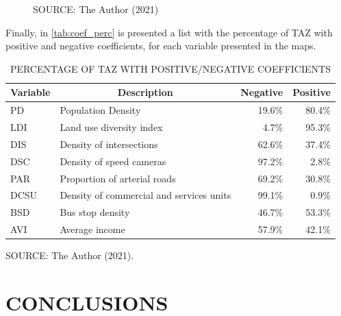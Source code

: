 \begin{figure}[!htbp]
\begin{subfigure}{0.5\textwidth}
    \end{subfigure}    
    \label{fig:gwr_ldi_bsd}
    \par SOURCE: The Author (2021)
\end{figure}


Finally, in \autoref{tab:coef_perc} is presented a list with the percentage of TAZ with positive and negative coefficients, for each variable presented in the maps.

\begin{table}[!htbp]
    \footnotesize
    \captionsetup{justification=raggedright,
        singlelinecheck=false,
        font=footnotesize}
    \caption{PERCENTAGE OF TAZ WITH POSITIVE/NEGATIVE COEFFICIENTS}
    \centering
    \begin{tabular}{llrr}
        \hline
        \multicolumn{1}{c}{\textbf{Variable}} & \multicolumn{1}{c}{\textbf{Description}} & \multicolumn{1}{c}{\textbf{Negative}} & \multicolumn{1}{c}{\textbf{Positive}} \\
        \hline
        PD   & Population Density                       & 19.6\% & 80.4\% \\
        LDI  & Land use diversity index                 & 4.7\%  & 95.3\% \\
        DIS  & Density of intersections                 & 62.6\% & 37.4\% \\
        DSC  & Density of speed cameras                 & 97.2\% & 2.8\%  \\
        PAR  & Proportion of arterial roads             & 69.2\% & 30.8\% \\
        DCSU & Density of commercial and services units & 99.1\% & 0.9\%  \\
        BSD  & Bus stop density                         & 46.7\% & 53.3\% \\
        AVI  & Average income                           & 57.9\% & 42.1\% \\
        \hline
    \end{tabular}
    \label{tab:coef_perc}
    \par \vspace{2mm} \footnotesize \raggedright
    SOURCE: The Author (2021).
\end{table}



\chapter{CONCLUSIONS} \label{cap:conclusion}

